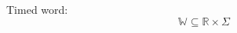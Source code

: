 
\begin{definition}\label{definition:TimedWord}
    Timed word:
    $$\mathbb{W}\subseteq\mathbb{R}\times\Sigma$$
\end{definition}
